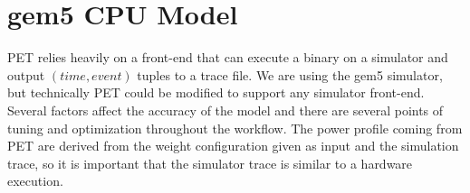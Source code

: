 \section{gem5 CPU Model}

PET relies heavily on a front-end that can execute a binary on a simulator and
output $(time, event)$ tuples to a trace file. We are using the gem5 simulator,
but technically PET could be modified to support any simulator front-end.
Several factors affect the accuracy of the model and there are several points of
tuning and optimization throughout the workflow. The power profile coming from
PET are derived from the weight configuration given as input and the simulation
trace, so it is important that the simulator trace is similar to a hardware
execution.

